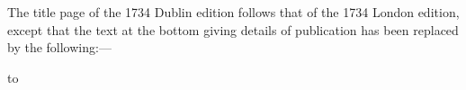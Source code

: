 \smallskip

The title page of the 1734 Dublin edition follows that of the
1734 London edition, except that the text at the bottom giving
details of publication has been replaced by the following:---

\vskip6pt

\hbox to 

\bigbreak\bigskip


\vskip3pt


\vfill\eject


\null\vfill

